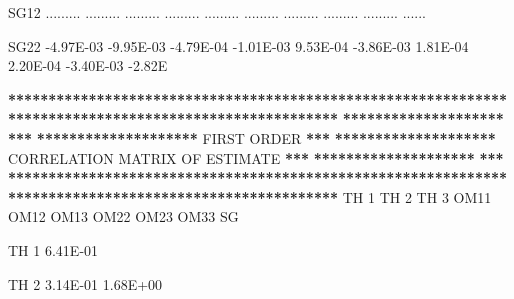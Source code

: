 \documentclass[
  11pt,
  krantz2,
  a4paper]{krantz}
\newenvironment{Shaded}{\begin{snugshade}}{\end{snugshade}}
\newcommand{\DecValTok}[1]{\textcolor[rgb]{0.00,0.00,0.81}{#1}}
\newcommand{\ErrorTok}[1]{\textcolor[rgb]{0.64,0.00,0.00}{\textbf{#1}}}
\newcommand{\FloatTok}[1]{\textcolor[rgb]{0.00,0.00,0.81}{#1}}
\newcommand{\NormalTok}[1]{#1}
\newcommand{\OperatorTok}[1]{\textcolor[rgb]{0.81,0.36,0.00}{\textbf{#1}}}
\newcommand{\StringTok}[1]{\textcolor[rgb]{0.31,0.60,0.02}{#1}}
\theoremstyle{definition}
\theoremstyle{definition}
\theoremstyle{definition}
\theoremstyle{remark}
\begin{document}
\begin{Shaded}
\begin{Highlighting}[]
\NormalTok{SG12   ......... ......... ......... ......... ......... ......... ......... ......... ......... ......}
                                                                                                       
\NormalTok{SG22   }\FloatTok{{-}4.97E{-}03} \FloatTok{{-}9.95E{-}03} \FloatTok{{-}4.79E{-}04} \FloatTok{{-}1.01E{-}03}  \FloatTok{9.53E{-}04} \FloatTok{{-}3.86E{-}03}  \FloatTok{1.81E{-}04}  \FloatTok{2.20E{-}04} \FloatTok{{-}3.40E{-}03} \FloatTok{{-}2.82}\NormalTok{E}
                                                                                                       
                                                                                                       
\OperatorTok{**}\ErrorTok{*****************************************************************************************************}
\ErrorTok{********************}\StringTok{                                                                                }\ErrorTok{***}
\ErrorTok{********************}\StringTok{                                   }\NormalTok{FIRST ORDER                                  }\OperatorTok{**}\ErrorTok{*}
\ErrorTok{********************}\StringTok{                          }\NormalTok{CORRELATION MATRIX OF ESTIMATE                        }\OperatorTok{**}\ErrorTok{*}
\ErrorTok{********************}\StringTok{                                                                                }\ErrorTok{***}
\ErrorTok{*******************************************************************************************************}
\StringTok{                                                                                                       }
\StringTok{                                                                                                       }
\StringTok{           }\NormalTok{TH }\DecValTok{1}\NormalTok{      TH }\DecValTok{2}\NormalTok{      TH }\DecValTok{3}\NormalTok{      OM11      OM12      OM13      OM22      OM23      OM33      SG}
                                                                                                       
                                                                                                       
\NormalTok{TH }\DecValTok{1}    \FloatTok{6.41E{-}01}                                                                                       
                                                                                                       
\NormalTok{TH }\DecValTok{2}    \FloatTok{3.14E{-}01}  \FloatTok{1.68E+00}                                                                             
                                                                                                       

\end{Highlighting}
\end{Shaded}
\end{document}

